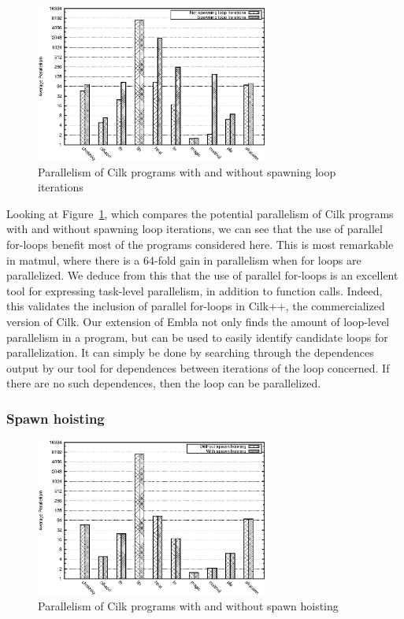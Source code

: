 \begin{figure}
 \centering
 \includegraphics[width=3in]{cilk-loop}
 \caption{Parallelism of Cilk programs with and without spawning loop iterations}
 \label{cilk-loop}
\end{figure}

Looking at Figure~\ref{cilk-loop}, which compares the potential parallelism of Cilk programs with and without spawning loop iterations, we can see that the use of parallel for-loops benefit most of the programs considered here.
This is most remarkable in matmul, where there is a 64-fold gain in parallelism when for loops are parallelized.
We deduce from this that the use of parallel for-loops is an excellent tool for expressing task-level parallelism, in addition to function calls.
Indeed, this validates the inclusion of parallel for-loops in Cilk++, the commercialized version of Cilk.
Our extension of Embla not only finds the amount of loop-level parallelism in a program, but can be used to easily identify candidate loops for parallelization.
It can simply be done by searching through the dependences output by our tool for dependences between iterations of the loop concerned.
If there are no such dependences, then the loop can be parallelized.

\subsubsection{Spawn hoisting}

\begin{figure}
 \centering
 \includegraphics[width=3in]{cilk-hoist}
 \caption{Parallelism of Cilk programs with and without spawn hoisting}
 \label{cilk-hoist}
\end{figure}

